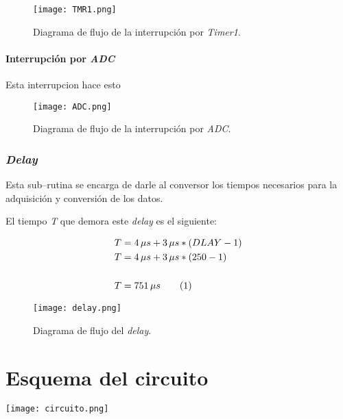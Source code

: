 \documentclass[12pt,a4paper]{article}
\newcommand\numberthis{\addtocounter{equation}{1}\tag{\theequation}}
\begin{document}
	\begin{figure}[H]
	\texttt{[image: TMR1.png]}
	\centering
	\caption{Diagrama de flujo de la interrupción por \emph{Timer1}.}
	\label{TM1}
	\end{figure}
	
	\paragraph{Interrupción por \emph{ADC}} Esta interrupcion hace esto
	
	\begin{figure}[H]
	\texttt{[image: ADC.png]}
	\centering
	\caption{Diagrama de flujo de la interrupción por \emph{ADC}.}
	\label{ADC}
	\end{figure}
	
	\subsubsection{\emph{Delay}}
	Esta sub--rutina se encarga de darle al conversor los tiempos necesarios para la adquisición y conversión de los datos.
	
	El tiempo \emph{T} que demora este \emph{delay} es el siguiente:
	
	\begin{align*}
	T &= 4\, \mu s + 3\,\mu s * (DLAY - 1)\\
	T &= 4\, \mu s + 3\,\mu s * (250 - 1)\\
	\\T &= 751\, \mu s \numberthis
	\end{align*}
	
	\begin{figure}[H]
	\texttt{[image: delay.png]}
	\centering
	\caption{Diagrama de flujo del \emph{delay}.}
	\end{figure}

\newpage
\section{Esquema del circuito}
\centering
\texttt{[image: circuito.png]}
	
\end{document}
